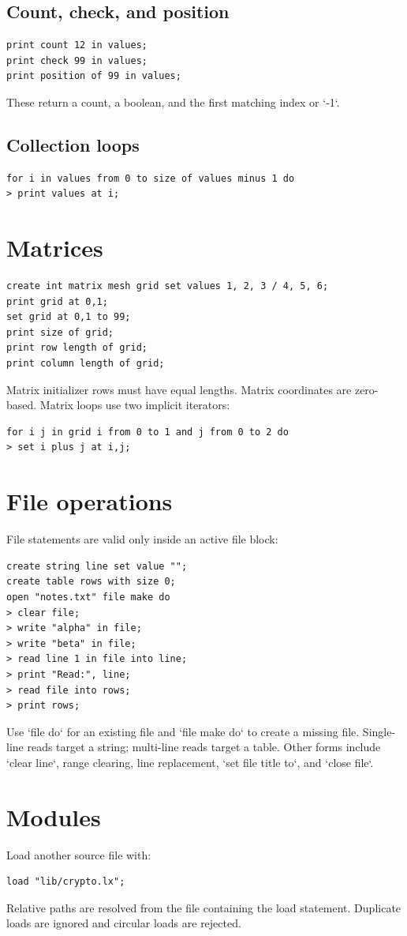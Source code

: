 \documentclass[10.5pt,a4paper]{article}
\begin{document}
\subsection{Count, check, and position}
\begin{lstlisting}
print count 12 in values;
print check 99 in values;
print position of 99 in values;
\end{lstlisting}
These return a count, a boolean, and the first matching index or `-1`.
\subsection{Collection loops}
\begin{lstlisting}
for i in values from 0 to size of values minus 1 do
> print values at i;
\end{lstlisting}
\section{Matrices}
\begin{lstlisting}
create int matrix mesh grid set values 1, 2, 3 / 4, 5, 6;
print grid at 0,1;
set grid at 0,1 to 99;
print size of grid;
print row length of grid;
print column length of grid;
\end{lstlisting}
Matrix initializer rows must have equal lengths. Matrix coordinates are zero-based. Matrix loops use two implicit iterators:
\begin{lstlisting}
for i j in grid i from 0 to 1 and j from 0 to 2 do
> set i plus j at i,j;
\end{lstlisting}
\section{File operations}
File statements are valid only inside an active file block:
\begin{lstlisting}
create string line set value "";
create table rows with size 0;
open "notes.txt" file make do
> clear file;
> write "alpha" in file;
> write "beta" in file;
> read line 1 in file into line;
> print "Read:", line;
> read file into rows;
> print rows;
\end{lstlisting}
Use `file do` for an existing file and `file make do` to create a missing file. Single-line reads target a string; multi-line reads target a table. Other forms include `clear line`, range clearing, line replacement, `set file title to`, and `close file`.
\section{Modules}
Load another source file with:
\begin{lstlisting}
load "lib/crypto.lx";
\end{lstlisting}
Relative paths are resolved from the file containing the load statement. Duplicate loads are ignored and circular loads are rejected.
\end{document}
